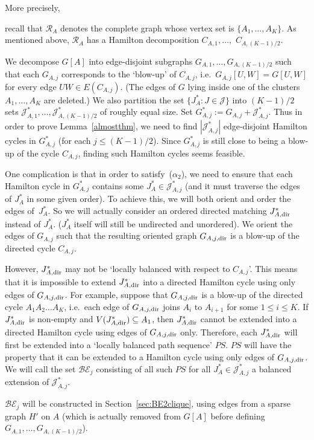 \documentclass{memo-l}
\def\COMMENT#1{}
\numberwithin{section}{chapter}
\numberwithin{equation}{section}
\numberwithin{firstthm}{section}
\numberwithin{figure}{section}
\begin{document}
{More precisely,%
    \COMMENT{Andy: reworded} 
recall that $\mathcal{R}_A$ denotes the complete graph whose vertex set is $\{A_1, \dots, A_K \}$.
As mentioned above, $\mathcal{R}_A$ has a Hamilton decomposition $C_{A,1}, \dots,$ $ C_{A,(K-1)/2}$.%
    \COMMENT{Daniela: changed $C_j$ to $C_{A,j}$ here and below}
We decompose $G[A]$ into edge-disjoint subgraphs $G_{A,1}, \dots,G_{A,{(K-1)/2}}$ such that each $G_{A,j}$ corresponds to the `blow-up' of $C_{A,j}$,
i.e.~$G_{A,j}[U,W] = G[U,W]$ for every edge $UW \in E(C_{A,j})$. (The edges of $G$ lying inside one of the clusters $A_1, \dots, A_K$
are deleted.) We also partition the set $\{J^*_A: J\in\mathcal{J}\}$ into $(K-1)/2$ sets
$\mathcal{J}^*_{A,1}, \dots, \mathcal{J}^*_{A,(K-1)/2}$ of roughly equal size. Set $G^*_{A,j} := G_{A,j} + \mathcal{J}^*_{A,j}$.
Thus in order to prove Lemma~\ref{almostthm}, we need to find $|\mathcal{J}^*_{A,j}|$ edge-disjoint Hamilton cycles in $G^*_{A,j}$
(for each $j\le (K-1)/2$).
Since $G^*_{A,j}$ is still close to being a blow-up of the cycle $C_{A,j}$, finding such Hamilton cycles %
seems feasible.

One complication is that in order to satisfy~($\alpha_2$), we need to ensure that each Hamilton cycle in $G^*_{A,j}$
contains some $J^*_A\in \mathcal{J}^*_{A,j}$ (and it must traverse the edges of $J^*_A$ in some given order).
To achieve this, we will both orient and order the edges of~$J^*_A$.
So we will actually consider an ordered directed matching $J^*_{A, {\rm dir}}$ instead of $J^*_A$. ($J^*_A$ itself will still be undirected and unordered).
We orient the edges of $G_{A,j}$ such that the resulting oriented graph $G_{A,j,{\rm dir}}$ is a blow-up of the directed cycle $C_{A,j}$.

However, $J^*_{A,{\rm dir}}$ may not be `locally balanced with respect to $C_{A,j}$'.
This means that it is impossible to extend $J^*_{A,{\rm dir}}$ into a directed Hamilton cycle using only edges of $G_{A,j,{\rm dir}}$.
For example, suppose that $G_{A,j,{\rm dir}}$ is a blow-up of the directed cycle $A_1A_2 \dots A_{K}$, i.e.~each edge of $G_{A,j,{\rm dir}}$
joins $A_i$ to $A_{i+1}$ for some $1\le i\le K$.
If $J^*_{A,{\rm dir}}$ is non-empty and $V(J^*_{A,{\rm dir}})\subseteq A_1$, then $J^*_{A,{\rm dir}}$
cannot be extended into a directed Hamilton cycle using edges of $G_{A,j,{\rm dir}}$ only.
Therefore, each $J^*_{A,{\rm dir}} $ will first be extended into a `locally balanced path sequence' $PS$.
$PS$ will have the property that it can be extended to a Hamilton cycle
using only edges of $G_{A,j,{\rm dir}}$. We will call the set $\mathcal{BE}_j$ consisting of all such $PS$ for all $J^*_A\in \mathcal{J}^*_{A,j}$
a balanced extension of $\mathcal{J}^*_{A,j}$.%
   \COMMENT{Deryk: changed $\mathcal{J}^*_{j}$ to $\mathcal{J}^*_{A,j}$ twice}
$\mathcal{BE}_j$ will be constructed in
Section~\ref{sec:BE2clique}, using edges from a sparse graph $H'$ on $A$ (which is actually removed from $G[A]$ before defining $G_{A,1}, \dots, G_{A,(K-1)/2}$).

}
\end{document}
